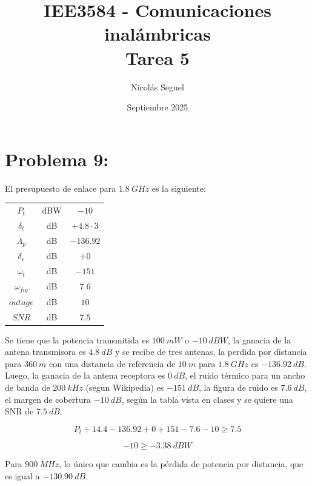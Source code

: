 \documentclass[11pt]{article}
\title{IEE3584 - Comunicaciones inalámbricas \\
Tarea 5}
\author{Nicolás Seguel}
\date{Septiembre 2025}
\begin{document}
\maketitle

\section*{Problema 9:}

El presupuesto de enlace para \(\SI{1.8}{GHz}\) es la siguiente:
\begin{center}
    \begin{tabular}{|c|c|c|}
        \hline
        \(P_t\) & dBW & \(-10\) \\
        \(\delta_t\) & dB & \(+4.8 \cdot 3\) \\
        \(\Lambda_p\) & dB & \(-136.92\) \\
        \(\delta_r\) & dB & \(+0\) \\
        \(\omega_t\) & dB & \(-151\) \\
        \(\omega_{fig}\) & dB & \(7.6\) \\
        \(outage\) & dB & \(10\) \\
        \(SNR\) & dB & \(7.5\) \\
        \hline
    \end{tabular}
\end{center}

Se tiene que la potencia transmitida es \(\SI{100}{mW}\) o \(\SI{-10}{dBW}\), la ganacia de la antena transmisora es \(\SI{4.8}{dB}\) y se recibe de tres antenas, la perdida por distancia para \(\SI{360}{m}\) con una distancia de referencia de \(\SI{10}{m}\) para \(\SI{1.8}{GHz}\) es \(\SI{-136.92}{dB}\). Luego, la ganacia de la antena receptora es \(\SI{0}{dB}\), el ruido térmico para un ancho de banda de \(\SI{200}{kHz}\) (segun Wikipedia) es \(\SI{-151}{dB}\), la figura de ruido es \(\SI{7.6}{dB}\), el margen de cobertura \(\SI{-10}{dB}\), según la tabla vista en clases y se quiere una SNR de \(\SI{7.5}{dB}\).

\begin{equation}
    P_t + 14.4 - 136.92 + 0 + 151 - 7.6 - 10 \geq 7.5
\end{equation}

\begin{equation}
    -10 \geq \SI{-3.38}{dBW}
\end{equation}

Para \(\SI{900}{MHz}\), lo único que cambia es la pérdida de potencia por distancia, que es igual a \(\SI{-130.90}{dB}\).
\end{document}
